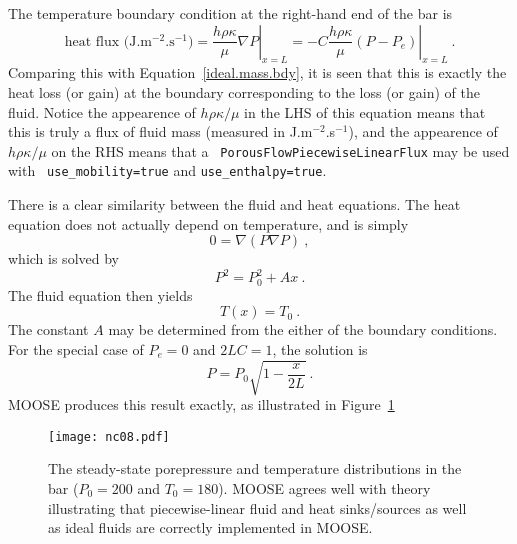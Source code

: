 \documentclass[]{scrreprt}
\begin{document}
The temperature boundary condition
at the right-hand end of the bar is
\begin{equation}
\mbox{heat flux (J.m$^{-2}$.s$^{-1}$)} =
\left. \frac{h\rho\kappa}{\mu}\nabla P \right|_{x=L} =
\left. -C\frac{h\rho\kappa}{\mu} (P - P_{e}) \right|_{x=L} \ .
\end{equation}
Comparing this with Equation~\ref{ideal.mass.bdy}, it is seen that
this is exactly the heat loss (or gain) at the boundary corresponding
to the loss (or gain) of the fluid.  Notice the appearence of $h\rho
\kappa/\mu$ in the LHS of this equation means that this is truly a
flux of fluid mass (measured in J.m$^{-2}$.s$^{-1}$), and the
appearence of $h\rho\kappa/\mu$ on the RHS means that a {\tt
  PorousFlowPiecewiseLinearFlux} may be used with {\tt
  use\_mobility=true} and {\tt use\_enthalpy=true}.

There is a clear similarity between the fluid and heat equations.  The
heat equation does not actually depend on temperature, and is simply
\begin{equation}
0 = \nabla (P\nabla P) \ ,
\end{equation}
which is solved by
\begin{equation}
P^{2} = P_{0}^{2} + Ax \ .
\end{equation}
The fluid equation then yields
\begin{equation}
T(x) = T_{0} \ .
\end{equation}
The constant $A$ may be determined from the either of the boundary
conditions.  For the special case of $P_{e}=0$ and $2LC=1$, the
solution is
\begin{equation}
P = P_{0} \sqrt{1 - \frac{x}{2L}} \ .
\end{equation}
MOOSE produces this result exactly, as illustrated in Figure~\ref{nc08.fig}

\begin{figure}[htb]
\begin{center}
\texttt{[image: nc08.pdf]}
\caption{The steady-state porepressure and temperature distributions
  in the bar ($P_{0}=200$ and $T_{0}=180$).  MOOSE agrees well with
  theory illustrating that piecewise-linear fluid and heat
  sinks/sources as well as ideal fluids are correctly implemented in
  MOOSE.}
\label{nc08.fig}
\end{center}
\end{figure}
\end{document}
